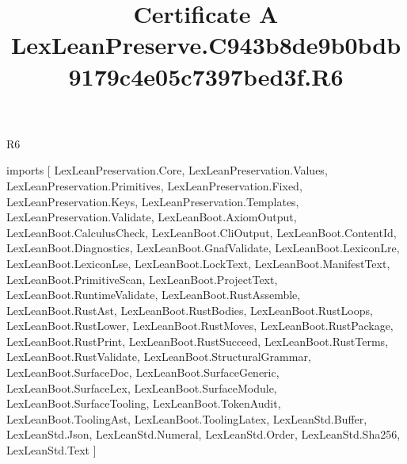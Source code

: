 \begin{lexlean}{R6}
\title{Certificate A LexLeanPreserve.C943b8de9b0bdb9179c4e05c7397bed3f.R6}
\begin{coremodule}
imports [
  LexLeanPreservation.Core,
  LexLeanPreservation.Values,
  LexLeanPreservation.Primitives,
  LexLeanPreservation.Fixed,
  LexLeanPreservation.Keys,
  LexLeanPreservation.Templates,
  LexLeanPreservation.Validate,
  LexLeanBoot.AxiomOutput,
  LexLeanBoot.CalculusCheck,
  LexLeanBoot.CliOutput,
  LexLeanBoot.ContentId,
  LexLeanBoot.Diagnostics,
  LexLeanBoot.GnafValidate,
  LexLeanBoot.LexiconLre,
  LexLeanBoot.LexiconLse,
  LexLeanBoot.LockText,
  LexLeanBoot.ManifestText,
  LexLeanBoot.PrimitiveScan,
  LexLeanBoot.ProjectText,
  LexLeanBoot.RuntimeValidate,
  LexLeanBoot.RustAssemble,
  LexLeanBoot.RustAst,
  LexLeanBoot.RustBodies,
  LexLeanBoot.RustLoops,
  LexLeanBoot.RustLower,
  LexLeanBoot.RustMoves,
  LexLeanBoot.RustPackage,
  LexLeanBoot.RustPrint,
  LexLeanBoot.RustSucceed,
  LexLeanBoot.RustTerms,
  LexLeanBoot.RustValidate,
  LexLeanBoot.StructuralGrammar,
  LexLeanBoot.SurfaceDoc,
  LexLeanBoot.SurfaceGeneric,
  LexLeanBoot.SurfaceLex,
  LexLeanBoot.SurfaceModule,
  LexLeanBoot.SurfaceTooling,
  LexLeanBoot.TokenAudit,
  LexLeanBoot.ToolingAst,
  LexLeanBoot.ToolingLatex,
  LexLeanStd.Buffer,
  LexLeanStd.Json,
  LexLeanStd.Numeral,
  LexLeanStd.Order,
  LexLeanStd.Sha256,
  LexLeanStd.Text
]


\end{coremodule}
\end{lexlean}
